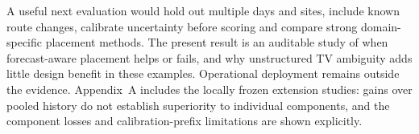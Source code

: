 \documentclass[11pt]{article}
\begin{document}
A useful next evaluation would hold out multiple days and sites, include
known route changes, calibrate uncertainty before scoring and compare
strong domain-specific placement methods. The present result is an
auditable study of when forecast-aware placement helps or fails, and why
unstructured TV ambiguity adds little design benefit in these examples.
Operational deployment remains outside the evidence. Appendix~A includes
the locally frozen extension studies: gains over pooled history do not
establish superiority to individual components, and the component losses
and calibration-prefix limitations are shown explicitly.



\clearpage
\appendix

\end{document}
